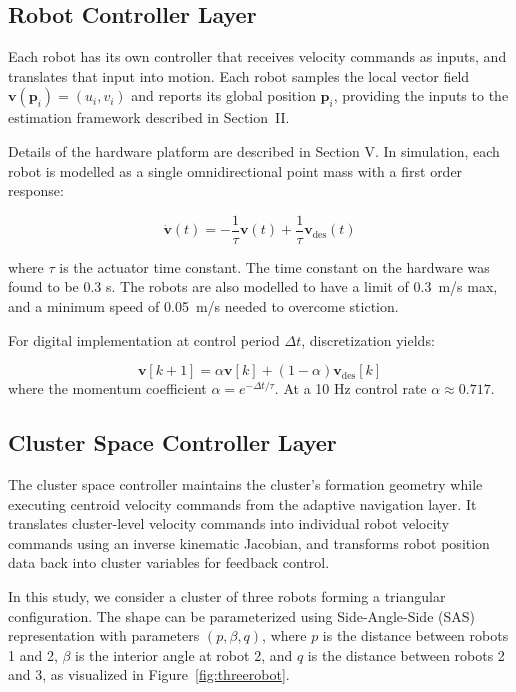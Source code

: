 \documentclass[lettersize,journal]{IEEEtran}
\begin{document}
\subsection{Robot Controller Layer}
\noindent 

Each robot has its own controller that receives velocity commands as inputs, and translates that input into motion. Each robot samples the local vector field $\mathbf{v}(\mathbf{p}_i) = (u_i, v_i)$ and reports its global position $\mathbf{p}_i$, providing the inputs to the estimation framework described in Section~II.

Details of the hardware platform are described in Section V.
In simulation, each robot is modelled as a single omnidirectional point mass with a first order response:

\begin{equation}
    \dot{\mathbf{v}}(t) = -\frac{1}{\tau}\mathbf{v}(t) + \frac{1}{\tau}\mathbf{v}_{\text{des}}(t)
    \label{eq:continuous}
    \end{equation}

where $\tau$ is the actuator time constant. The time constant on the hardware was found to be 0.3 s.  The robots are also modelled to have a limit of 0.3~m/s max, and a minimum speed of 0.05~m/s needed to overcome stiction.

For digital implementation at control period $\Delta t$, discretization yields:

\begin{equation}
\mathbf{v}[k+1] = \alpha \mathbf{v}[k] + (1-\alpha)\mathbf{v}_{\text{des}}[k]
\label{eq:momentum}
\end{equation}
where the momentum coefficient $\alpha = e^{-\Delta t/\tau}$. At a 10 Hz control rate $\alpha \approx 0.717$. 


\subsection{Cluster Space Controller Layer}

The cluster space controller maintains the cluster's formation geometry while executing centroid velocity commands from the adaptive navigation layer. It translates cluster-level velocity commands into individual robot velocity commands using an inverse kinematic Jacobian, and transforms robot position data back into cluster variables for feedback control.

In this study, we consider a cluster of three robots forming a triangular configuration. The shape can be parameterized using Side-Angle-Side (SAS) representation with parameters $(p, \beta, q)$, where $p$ is the distance between robots 1 and 2, $\beta$ is the interior angle at robot 2, and $q$ is the distance between robots 2 and 3, as visualized in Figure~\ref{fig:threerobot}.
\end{document}
